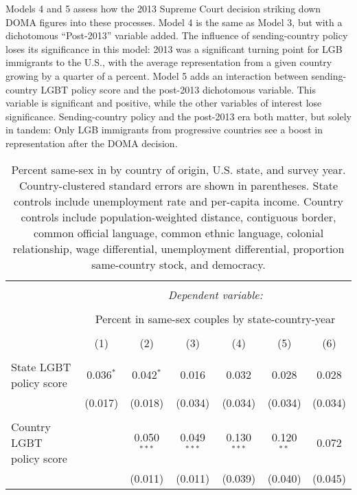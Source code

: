 \documentclass[
  11pt,
]{article}
\begin{document}
Models 4 and 5 assess how the 2013 Supreme Court decision striking down DOMA figures into these processes. Model 4 is the same as Model 3, but with a dichotomous ``Post-2013'' variable added. The influence of sending-country policy loses its significance in this model: 2013 was a significant turning point for LGB immigrants to the U.S., with the average representation from a given country growing by a quarter of a percent. Model 5 adds an interaction between sending-country LGBT policy score and the post-2013 dichotomous variable. This variable is significant and positive, while the other variables of interest lose significance. Sending-country policy and the post-2013 era both matter, but solely in tandem: Only LGB immigrants from progressive countries see a boost in representation after the DOMA decision.

\begin{table}[!htbp] \centering 
  \caption{Percent same-sex in by country of origin, U.S. state, and survey year. Country-clustered standard errors are shown in parentheses. State controls include unemployment rate and per-capita income. Country controls include population-weighted distance, contiguous border, common official language, common ethnic language, colonial relationship, wage differential, unemployment differential, proportion same-country stock, and democracy.} 
  \label{tab:state-props} 
\begin{tabular}{@{\extracolsep{5pt}}lcccccc} 
\\[-1.8ex]\hline 
\hline \\[-1.8ex] 
 & \multicolumn{6}{c}{\textit{Dependent variable:}} \\ 
\cline{2-7} 
\\[-1.8ex] & \multicolumn{6}{c}{Percent in same-sex couples by state-country-year} \\ 
\\[-1.8ex] & (1) & (2) & (3) & (4) & (5) & (6)\\ 
\hline \\[-1.8ex] 
 State LGBT policy score & 0.036$^{*}$ & 0.042$^{*}$ & 0.016 & 0.032 & 0.028 & 0.028 \\ 
  & (0.017) & (0.018) & (0.034) & (0.034) & (0.034) & (0.034) \\ 
  & & & & & & \\ 
 Country LGBT policy score &  & 0.050$^{***}$ & 0.049$^{***}$ & 0.130$^{***}$ & 0.120$^{**}$ & 0.072 \\ 
  &  & (0.011) & (0.011) & (0.039) & (0.040) & (0.045) \\ 

\end{tabular}
\end{table}
\end{document}
